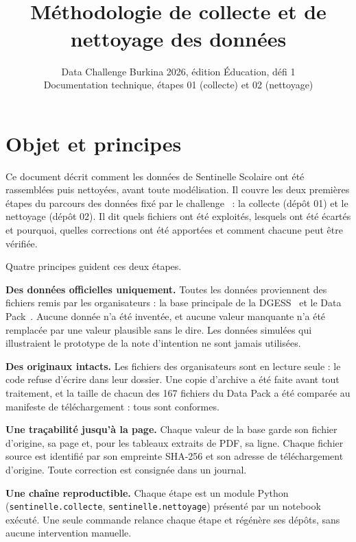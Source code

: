 \documentclass{article}
\title{\sol{}\\[3pt]
{\large\mdseries Méthodologie de collecte et de nettoyage des données}}
\author{
Data Challenge Burkina 2026, édition Éducation, défi 1\\
\affiliations
Documentation technique, étapes 01 (collecte) et 02 (nettoyage)
}
\renewcommand{\tablename}{Tableau}%
\renewcommand{\figurename}{Figure}%
\renewcommand{\refname}{Références}%
\newcommand{\sol}{Sentinelle Scolaire}
\begin{document}
\renewcommand{\tablename}{Tableau}\renewcommand{\figurename}{Figure}\renewcommand{\refname}{Références}
\raggedbottom

\maketitle
\thispagestyle{plain}
\pagestyle{plain}

\section{Objet et principes}

Ce document décrit comment les données de \sol{} ont été rassemblées puis nettoyées, avant toute modélisation. Il couvre les deux premières étapes du parcours des données fixé par le challenge~\cite{dcb_document} : la collecte (dépôt 01) et le nettoyage (dépôt 02). Il dit quels fichiers ont été exploités, lesquels ont été écartés et pourquoi, quelles corrections ont été apportées et comment chacune peut être vérifiée.

Quatre principes guident ces deux étapes.

\textbf{Des données officielles uniquement.} Toutes les données proviennent des fichiers remis par les organisateurs : la base principale de la DGESS~\cite{dgess_base} et le Data Pack~\cite{dcb_guide}. Aucune donnée n'a été inventée, et aucune valeur manquante n'a été remplacée par une valeur plausible sans le dire. Les données simulées qui illustraient le prototype de la note d'intention ne sont jamais utilisées.

\textbf{Des originaux intacts.} Les fichiers des organisateurs sont en lecture seule : le code refuse d'écrire dans leur dossier. Une copie d'archive a été faite avant tout traitement, et la taille de chacun des 167 fichiers du Data Pack a été comparée au manifeste de téléchargement : tous sont conformes.

\textbf{Une traçabilité jusqu'à la page.} Chaque valeur de la base garde son fichier d'origine, sa page et, pour les tableaux extraits de PDF, sa ligne. Chaque fichier source est identifié par son empreinte SHA-256 et son adresse de téléchargement d'origine. Toute correction est consignée dans un journal.

\textbf{Une chaîne reproductible.} Chaque étape est un module Python (\texttt{sentinelle.collecte}, \texttt{sentinelle.nettoyage}) présenté par un notebook exécuté. Une seule commande relance chaque étape et régénère ses dépôts, sans aucune intervention manuelle.
\end{document}
